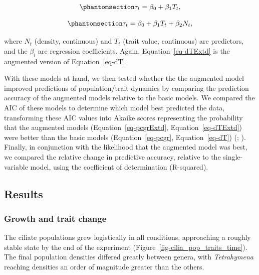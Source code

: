\documentclass[
  letterpaper,
  DIV=11,
  numbers=noendperiod]{scrartcl}
\begin{document}
\begin{equation}\phantomsection\label{eq-dT}{
\tau_t = \beta_0 + \beta_1 T_t,
}\end{equation}

\begin{equation}\phantomsection\label{eq-dTExtd}{
\tau_t = \beta_0 + \beta_1 T_t + \beta_2 N_t,
}\end{equation}

where \(N_t\) (density, continuous) and \(T_t\) (trait value,
continuous) are predictors, and the \(\beta_i\) are regression
coefficients. Again, Equation~\ref{eq-dTExtd} is the augmented version
of Equation~\ref{eq-dT}.

With these models at hand, we then tested whether the the augmented
model improved predictions of population/trait dynamics by comparing the
prediction accuracy of the augmented models relative to the basic
models. We compared the AIC of these models to determine which model
best predicted the data, transforming these AIC values into Akaike
scores representing the probability that the augmented models
(Equation~\ref{eq-pcgrExtd}, Equation~\ref{eq-dTExtd}) were better than
the basic models (Equation~\ref{eq-pcgr}, Equation~\ref{eq-dT})
(;
). Finally, in
conjunction with the likelihood that the augmented model was best, we
compared the relative change in predictive accuracy, relative to the
single-variable model, using the coefficient of determination
(R-squared).

\subsection{Results}\label{sec-DAE_results}

\subsubsection{Growth and trait change}\label{growth-and-trait-change}

The ciliate populations grew logistically in all conditions, approaching
a roughly stable state by the end of the experiment
(Figure~\ref{fig-cilia_pop_traits_time}). The final population densities
differed greatly between genera, with \emph{Tetrahymena} reaching
densities an order of magnitude greater than the others.
\end{document}
